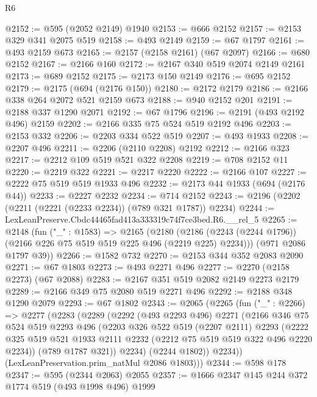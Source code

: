 \begin{lexlean}{R6}
\begin{coremodule}
@2152 := @595 (@2052 @2149) @1940
@2153 := @666 @2152
@2157 := @2153 @329 @341 @2075 @519
@2158 := @493 @2149
@2159 := @67 @1797
@2161 := @493 @2159 @673
@2165 := @2157 (@2158 @2161) (@67 @2097)
@2166 := @680 @2152
@2167 := @2166 @160
@2172 := @2167 @340 @519 @2074 @2149 @2161
@2173 := @689 @2152
@2175 := @2173 @150 @2149
@2176 := @695 @2152
@2179 := @2175 (@694 (@2176 @150))
@2180 := @2172 @2179
@2186 := @2166 @338 @264 @2072 @521 @2159 @673
@2188 := @940 @2152 @201
@2191 := @2188 @337 @1290 @2071
@2192 := @67 @1796
@2196 := @2191 (@493 @2192 @496) @2159
@2202 := @2166 @335 @75 @524 @519 @2192 @496
@2203 := @2153 @332
@2206 := @2203 @334 @522 @519
@2207 := @493 @1933
@2208 := @2207 @496
@2211 := @2206 (@2110 @2208) @2192
@2212 := @2166 @323
@2217 := @2212 @109 @519 @521 @322 @2208
@2219 := @708 @2152 @11
@2220 := @2219 @322
@2221 := @2217 @2220
@2222 := @2166 @107
@2227 := @2222 @75 @519 @519 @1933 @496
@2232 := @2173 @44 @1933 (@694 (@2176 @44))
@2233 := @2227 @2232
@2234 := @714 @2152
@2243 := @2196 (@2202 (@2211 (@2221 (@2233 @2234)) (@789 @321 @1787)) @2234)
@2244 := LexLeanPreserve.Cbdc44465fad413a333319c74f7ce3bed.R6.__rel_5
@2265 := @2148
    (fun ("_" : @1583) =>
    @2165
      (@2180 (@2186 (@2243 (@2244 @1796)) (@2166 @226 @75 @519 @519 @225 @496 (@2219 @225) @2234)))
      (@971 @2086 @1797 @39))
@2266 := @1582 @732
@2270 := @2153 @344 @352 @2083 @2090
@2271 := @67 @1803
@2273 := @493 @2271 @496
@2277 := @2270 (@2158 @2273) (@67 @2088)
@2283 := @2167 @351 @519 @2082 @2149 @2273 @2179
@2289 := @2166 @349 @75 @2080 @519 @2271 @496
@2292 := @2188 @348 @1290 @2079
@2293 := @67 @1802
@2343 := @2065
    (@2265
      (fun ("_" : @2266) =>
      @2277
        (@2283
          (@2289
            (@2292
              (@493 @2293 @496)
              @2271
              (@2166
                @346
                @75
                @524
                @519
                @2293
                @496
                (@2203
                  @326
                  @522
                  @519
                  (@2207 @2111)
                  @2293
                  (@2222
                    @325
                    @519
                    @521
                    @1933
                    @2111
                    @2232
                    (@2212 @75 @519 @519 @322 @496 @2220 @2234))
                  (@789 @1787 @321))
                @2234)
              (@2244 @1802))
            @2234))
        (LexLeanPreservation.prim_natMul @2086 @1803)))
@2344 := @598 @178
@2347 := @595 (@2344 @2063) @2055
@2357 := @1666 @2347 @145 @244 @372 @1774 @519 (@493 @1998 @496) @1999

\end{coremodule}
\end{lexlean}
